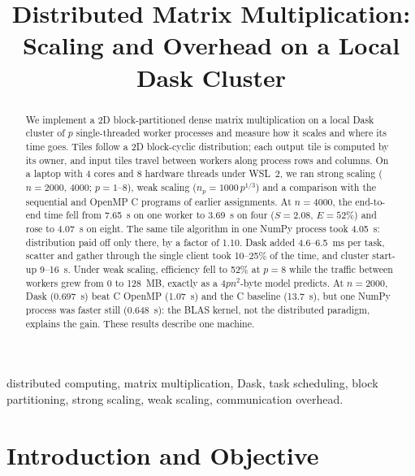 \documentclass[conference,a4paper]{IEEEtran}
\title{Distributed Matrix Multiplication:\\Scaling and Overhead on a Local Dask Cluster}
\author{\IEEEauthorblockN{{Javier Ruano Hernández}}
\IEEEauthorblockA{Big Data -- Assignment 4\\
Universidad de Las Palmas de Gran Canaria (ULPGC)\\
Code and data: \url{https://github.com/javierruanohdez/big-data-assignments/tree/main/assignment_4}}}
\begin{document}
\maketitle

\begin{abstract}
We implement a 2D block-partitioned dense matrix multiplication on a local
Dask cluster of $p$ single-threaded worker processes and measure how it scales
and where its time goes. Tiles follow a 2D block-cyclic distribution; each
output tile is computed by its owner, and input tiles travel between workers
along process rows and columns. On a laptop with 4 cores and 8 hardware threads
under WSL~2, we ran strong scaling ($n = 2000$, 4000; $p = 1$--8), weak scaling
($n_p = 1000\,p^{1/3}$) and a comparison with the sequential and OpenMP C
programs of earlier assignments. At $n = 4000$, the end-to-end time fell from
7.65~s on one worker to 3.69~s on four ($S = 2.08$, $E = 52\%$) and rose to
4.07~s on eight. The same tile algorithm in one NumPy process took 4.05~s:
distribution paid off only there, by a factor of 1.10. Dask added 4.6--6.5~ms
per task, scatter and gather through the single client took 10--25\% of the
time, and cluster start-up 9--16~s. Under weak scaling, efficiency fell to 52\%
at $p = 8$ while the traffic between workers grew from 0 to 128~MB, exactly as a
$4pn^2$-byte model predicts. At $n = 2000$, Dask (0.697~s) beat C OpenMP
(1.07~s) and the C baseline (13.7~s), but one NumPy process was faster still
(0.648~s): the BLAS kernel, not the distributed paradigm, explains the gain.
These results describe one machine.
\end{abstract}

\begin{IEEEkeywords}
distributed computing, matrix multiplication, Dask, task scheduling, block
partitioning, strong scaling, weak scaling, communication overhead.
\end{IEEEkeywords}

\section{Introduction and Objective}
\label{sec:intro}
\end{document}

